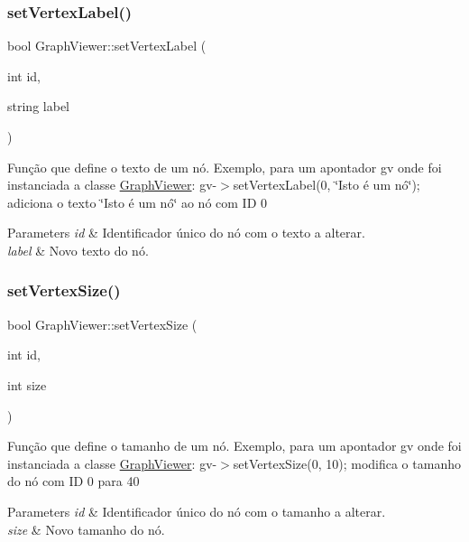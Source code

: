\subsubsection{\texorpdfstring{set\+Vertex\+Label()}{setVertexLabel()}}
{\footnotesize\ttfamily bool Graph\+Viewer\+::set\+Vertex\+Label (\begin{DoxyParamCaption}\item[{int}]{id,  }\item[{string}]{label }\end{DoxyParamCaption})}

Função que define o texto de um nó. Exemplo, para um apontador gv onde foi instanciada a classe \hyperlink{class_graph_viewer}{Graph\+Viewer}\+: gv-\/$>$set\+Vertex\+Label(0, \char`\"{}\+Isto é um nó\char`\"{}); adiciona o texto \char`\"{}\+Isto é um nó\char`\"{} ao nó com ID 0


\begin{DoxyParams}{Parameters}
{\em id} & Identificador único do nó com o texto a alterar. \\
\hline
{\em label} & Novo texto do nó. \\
\hline
\end{DoxyParams}
\hypertarget{class_graph_viewer_ae930dfdfcdeb7a871eefb6028d74b9f9}{}\label{class_graph_viewer_ae930dfdfcdeb7a871eefb6028d74b9f9} 
\subsubsection{\texorpdfstring{set\+Vertex\+Size()}{setVertexSize()}}
{\footnotesize\ttfamily bool Graph\+Viewer\+::set\+Vertex\+Size (\begin{DoxyParamCaption}\item[{int}]{id,  }\item[{int}]{size }\end{DoxyParamCaption})}

Função que define o tamanho de um nó. Exemplo, para um apontador gv onde foi instanciada a classe \hyperlink{class_graph_viewer}{Graph\+Viewer}\+: gv-\/$>$set\+Vertex\+Size(0, 10); modifica o tamanho do nó com ID 0 para 40


\begin{DoxyParams}{Parameters}
{\em id} & Identificador único do nó com o tamanho a alterar. \\
\hline
{\em size} & Novo tamanho do nó. \\
\hline
\end{DoxyParams}


